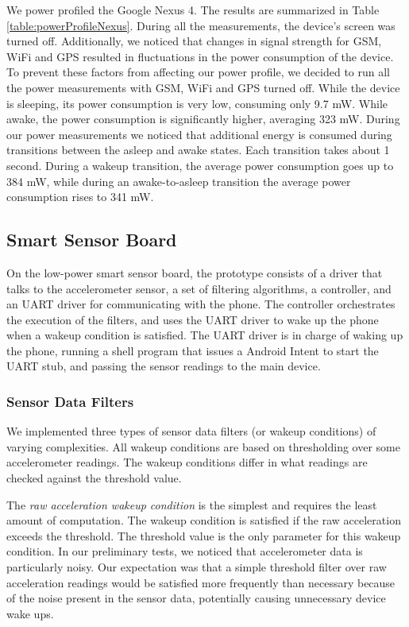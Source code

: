We power profiled the Google Nexus 4. The results are summarized in Table \ref{table:powerProfileNexus}. During all the measurements, the device's screen was turned off. Additionally, we noticed that changes in signal strength for GSM, WiFi and GPS resulted in fluctuations in the power consumption of the device. To prevent these factors from affecting our power profile, we decided to run all the power measurements with GSM, WiFi and GPS turned off. While the device is sleeping, its power consumption is very low, consuming only 9.7 mW. While awake, the power consumption is significantly higher, averaging 323 mW. During our power measurements we noticed that additional energy is consumed during transitions between the asleep and awake states. Each transition takes about 1 second. During a wakeup transition, the average power consumption goes up to 384 mW, while during an awake-to-asleep transition the average power consumption rises to 341 mW.


\subsection{Smart Sensor Board}

On the low-power smart sensor board, the prototype consists of a driver that talks to the accelerometer sensor, a set of filtering algorithms, a controller, and an UART driver for communicating with the phone. The controller orchestrates the execution of the filters, and uses the UART driver to wake up the phone when a wakeup condition is satisfied. The UART driver is in charge of waking up the phone, running a shell program that issues a Android Intent to start the UART stub, and passing the sensor readings to the main device. 

\subsubsection{Sensor Data Filters}
\label{sec:sensorDataFilters}

We implemented three types of sensor data filters (or wakeup conditions) of varying complexities. All wakeup conditions are based on thresholding over some accelerometer readings. The wakeup conditions differ in what readings are checked against the threshold value.

The \emph{raw acceleration wakeup condition} is the simplest and requires the least amount of computation. The wakeup condition is satisfied if the raw acceleration exceeds the threshold. The threshold value is the only parameter for this wakeup condition. In our preliminary tests, we noticed that accelerometer data is particularly noisy. Our expectation was that a simple threshold filter over raw acceleration readings would be satisfied more frequently than necessary because of the noise present in the sensor data, potentially causing unnecessary device wake ups. 

